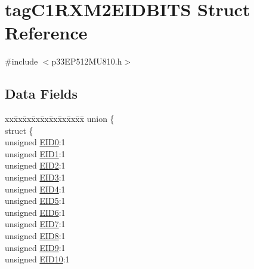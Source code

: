\hypertarget{structtag_c1_r_x_m2_e_i_d_b_i_t_s}{}\section{tag\+C1\+R\+X\+M2\+E\+I\+D\+B\+I\+TS Struct Reference}
\label{structtag_c1_r_x_m2_e_i_d_b_i_t_s}


{\ttfamily \#include $<$p33\+E\+P512\+M\+U810.\+h$>$}

\subsection*{Data Fields}
\begin{DoxyCompactItemize}
\item 
\begin{tabbing}
xx\=xx\=xx\=xx\=xx\=xx\=xx\=xx\=xx\=\kill
union \{\\
\>struct \{\\
\>\>unsigned \hyperlink{structtag_c1_r_x_m2_e_i_d_b_i_t_s_a9da8b7b30247e4f9cd8cc056549aa9fd}{EID0}:1\\
\>\>unsigned \hyperlink{structtag_c1_r_x_m2_e_i_d_b_i_t_s_afd6c139491d147c1262f3d051c6691e9}{EID1}:1\\
\>\>unsigned \hyperlink{structtag_c1_r_x_m2_e_i_d_b_i_t_s_a36ec62d8d3c5acd5d15e6691dc099a94}{EID2}:1\\
\>\>unsigned \hyperlink{structtag_c1_r_x_m2_e_i_d_b_i_t_s_ab895f7d0ac289a0383b607cbc62eebe2}{EID3}:1\\
\>\>unsigned \hyperlink{structtag_c1_r_x_m2_e_i_d_b_i_t_s_a136d5a709d6618d40acceccb43036656}{EID4}:1\\
\>\>unsigned \hyperlink{structtag_c1_r_x_m2_e_i_d_b_i_t_s_a8dffb2d86a6c184df505ae7c71a58710}{EID5}:1\\
\>\>unsigned \hyperlink{structtag_c1_r_x_m2_e_i_d_b_i_t_s_af8a8574102515d8f1a4b7fd1685d0532}{EID6}:1\\
\>\>unsigned \hyperlink{structtag_c1_r_x_m2_e_i_d_b_i_t_s_a84c3262e67f8d5fd387ac10bde6fa9b1}{EID7}:1\\
\>\>unsigned \hyperlink{structtag_c1_r_x_m2_e_i_d_b_i_t_s_acca25e0b7d86eb499d01f85222baea87}{EID8}:1\\
\>\>unsigned \hyperlink{structtag_c1_r_x_m2_e_i_d_b_i_t_s_ac6748f73d4ada8538b06548be4f396c2}{EID9}:1\\
\>\>unsigned \hyperlink{structtag_c1_r_x_m2_e_i_d_b_i_t_s_a9cea8e77ecbb72bd3b08102412793725}{EID10}:1\\

\end{tabbing}
\end{DoxyCompactItemize}
